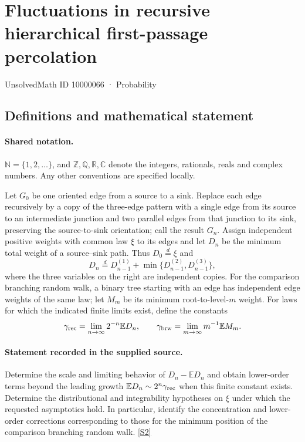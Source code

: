 \documentclass[11pt]{article}
\newcommand{\sref}[2]{\hyperlink{source:#1:#2}{[S#2]}}
\begin{document}
\setcounter{section}{10000065}
\section{Fluctuations in recursive hierarchical first-passage percolation}\label{10000066}
{\small\sffamily UnsolvedMath ID 10000066 · Probability}
\subsection{Definitions and mathematical statement}

\paragraph{Shared notation.}$\mathbb N=\{1,2,\ldots\}$, and $\mathbb Z,\mathbb Q,\mathbb R,\mathbb C$ denote the integers, rationals, reals and complex numbers. Any other conventions are specified locally.


Let $G_0$ be one oriented edge from a source to a sink. Replace each edge recursively by a copy of the three-edge pattern with a single edge from its source to an intermediate junction and two parallel edges from that junction to its sink, preserving the source-to-sink orientation; call the result $G_n$. Assign independent positive weights with common law $\xi$ to its edges and let $D_n$ be the minimum total weight of a source--sink path. Thus $D_0\stackrel d=\xi$ and
\[D_n\stackrel d=D_{n-1}^{(1)}+\min\{D_{n-1}^{(2)},D_{n-1}^{(3)}\},\]
where the three variables on the right are independent copies. For the comparison branching random walk, a binary tree starting with an edge has independent edge weights of the same law; let $M_m$ be its minimum root-to-level-$m$ weight. For laws for which the indicated finite limits exist, define the constants
\[\gamma_{\rm rec}=\lim_{n\to\infty}2^{-n}\mathbb E D_n,\qquad\gamma_{\rm brw}=\lim_{m\to\infty}m^{-1}\mathbb E M_m.\]
\paragraph{Statement recorded in the supplied source.}
Determine the scale and limiting behavior of $D_n-\mathbb E D_n$ and obtain lower-order terms beyond the leading growth $\mathbb E D_n\sim 2^n\gamma_{\rm rec}$ when this finite constant exists. Determine the distributional and integrability hypotheses on $\xi$ under which the requested asymptotics hold. In particular, identify the concentration and lower-order corrections corresponding to those for the minimum position of the comparison branching random walk. \sref{10000066}{2}
\end{document}
